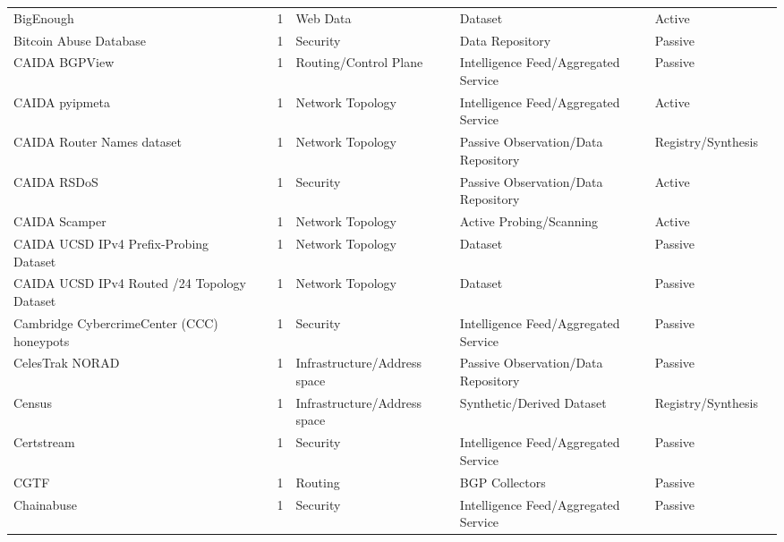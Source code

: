 \begin{table}[h!]
\begin{tabular}{lllllll}
BigEnough & \cite{10179289} & 1 & Web Data & Dataset & Active & \cite{10.1007/978-3-032-18268-5_13} \\
Bitcoin Abuse Database & \cite{bitcoin_abuse} & 1 & Security & Data Repository & Passive & \cite{10.1007/978-3-031-56252-5_3} \\
CAIDA BGPView & \cite{caida-bgpview} & 1 & Routing/Control Plane & Intelligence Feed/Aggregated Service & Passive & \cite{10.1145/3618257.3624819} \\
CAIDA pyipmeta & \cite{caida-pyipmeta} & 1 & Network Topology & Intelligence Feed/Aggregated Service & Active & \cite{10.1007/978-3-031-56249-5_8} \\
CAIDA Router Names dataset & \cite{caida-router-names} & 1 & Network Topology & Passive Observation/Data Repository & Registry/Synthesis & \cite{10.1145/3487552.3487848} \\
CAIDA RSDoS & \cite{caida-rsdos} & 1 & Security & Passive Observation/Data Repository & Active & \cite{10.1145/3517745.3561458} \\
CAIDA Scamper & \cite{caida-scamper} & 1 & Network Topology & Active Probing/Scanning & Active & \cite{10.1007/978-3-031-85960-1_3} \\
CAIDA UCSD IPv4 Prefix-Probing Dataset & \cite{caidaprobing} & 1 & Network Topology & Dataset & Passive & \cite{10.1145/3777912.3839834} \\
CAIDA UCSD IPv4 Routed /24 Topology Dataset & \cite{caidaipv4} & 1 & Network Topology & Dataset & Passive & \cite{10.1145/3777912.3839834} \\
Cambridge CybercrimeCenter (CCC) honeypots & \cite{ccc-honeypots} & 1 & Security & Intelligence Feed/Aggregated Service & Passive & \cite{10.1145/3487552.3487835} \\
CelesTrak NORAD & \cite{celestrak-norad} & 1 & Infrastructure/Address space & Passive Observation/Data Repository & Passive & \cite{10.1145/3646547.3689024} \\
Census & \cite{census} & 1 & Infrastructure/Address space & Synthetic/Derived Dataset & Registry/Synthesis & \cite{10.1145/3646547.3688452} \\
Certstream & \cite{certstream} & 1 & Security & Intelligence Feed/Aggregated Service & Passive & \cite{10.1145/3646547.3689021} \\
CGTF & \cite{cgtf} & 1 & Routing & BGP Collectors & Passive & \cite{10.1145/3777912.3839829} \\
Chainabuse & \cite{chainabuse} & 1 & Security & Intelligence Feed/Aggregated Service & Passive & \cite{10.1145/3730567.3764476} \\

\end{tabular}
\end{table}
